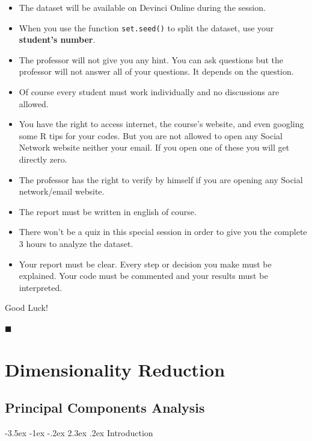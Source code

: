 \documentclass[]{book}
\makeatletter
\providecommand{\tightlist}{%
  \setlength{\itemsep}{0pt}\setlength{\parskip}{0pt}}
\renewcommand\section{\@startsection {section}{1}{\z@}%
                                   {-3.5ex \@plus -1ex \@minus -.2ex}%
                                   {2.3ex \@plus.2ex}%
                                   {\normalfont\Large\bfseries\color{ForestGreen}}}
\theoremstyle{definition}
\theoremstyle{definition}
\theoremstyle{definition}
\theoremstyle{remark}
\makeatother
\begin{document}
\begin{itemize}
\item
  The dataset will be available on Devinci Online during the session.
\item
  When you use the function \texttt{set.seed()} to split the dataset,
  use your \textbf{student's number}.
\item
  The professor will not give you any hint. You can ask questions but
  the professor will not answer all of your questions. It depends on the
  question.
\item
  Of course every student must work individually and no discussions are
  allowed.
\item
  You have the right to access internet, the course's website, and even
  googling some R tips for your codes. But you are not allowed to open
  any Social Network website neither your email. If you open one of
  these you will get directly zero.
\item
  The professor has the right to verify by himself if you are opening
  any Social network/email website.
\item
  The report must be written in english of course.
\item
  There won't be a quiz in this special session in order to give you the
  complete 3 hours to analyze the dataset.
\end{itemize}

\begin{itemize}
\tightlist
\item
  Your report must be clear. Every step or decision you make must be
  explained. Your code must be commented and your results must be
  interpreted.
\end{itemize}

Good Luck!

◼

\part{Dimensionality
Reduction}\label{part-dimensionality-reduction}

\chapter{Principal Components
Analysis}\label{principal-components-analysis}

\section{Introduction}\label{introduction-3}
\end{document}
